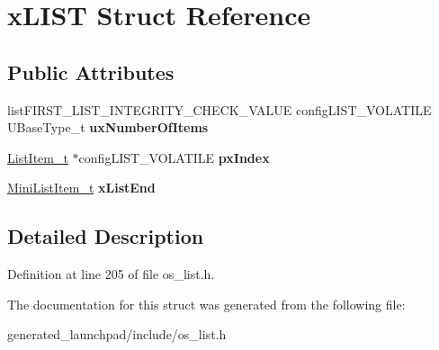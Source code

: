 \hypertarget{structxLIST}{}\section{x\+L\+I\+ST Struct Reference}
\label{structxLIST}
\subsection*{Public Attributes}
\begin{DoxyCompactItemize}
\item 
\mbox{\label{structxLIST_aa5cb7cdc699e1252af0441e46e427a03}} 
list\+F\+I\+R\+S\+T\+\_\+\+L\+I\+S\+T\+\_\+\+I\+N\+T\+E\+G\+R\+I\+T\+Y\+\_\+\+C\+H\+E\+C\+K\+\_\+\+V\+A\+L\+UE config\+L\+I\+S\+T\+\_\+\+V\+O\+L\+A\+T\+I\+LE U\+Base\+Type\+\_\+t {\bfseries ux\+Number\+Of\+Items}
\item 
\mbox{\label{structxLIST_a7bf64d87701493b4c8c5c977682500d7}} 
\mbox{\hyperlink{structxLIST__ITEM}{List\+Item\+\_\+t}} $\ast$config\+L\+I\+S\+T\+\_\+\+V\+O\+L\+A\+T\+I\+LE {\bfseries px\+Index}
\item 
\mbox{\label{structxLIST_a49ad62fa153126e27e273811167b336a}} 
\mbox{\hyperlink{structxMINI__LIST__ITEM}{Mini\+List\+Item\+\_\+t}} {\bfseries x\+List\+End}
\end{DoxyCompactItemize}


\subsection{Detailed Description}


Definition at line 205 of file os\+\_\+list.\+h.



The documentation for this struct was generated from the following file\+:\begin{DoxyCompactItemize}
\item 
generated\+\_\+launchpad/include/os\+\_\+list.\+h\end{DoxyCompactItemize}
